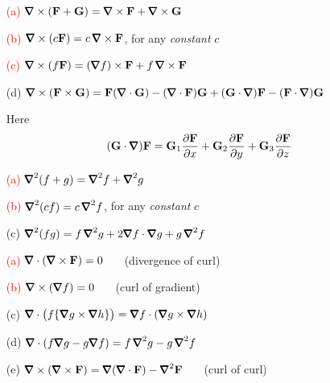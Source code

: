 \begin{theorem}\label{thm:curlIdentities}
\begin{enumerate}
\item[\textcolor{red}{(a)}]
\textcolor{red}{$\vnabla\times(\vF+\vG)=\vnabla\times\vF+\vnabla \times\vG$}
\item[\textcolor{red}{(b)}]
\textcolor{red}{$\vnabla\times(c\vF)=c\,\vnabla\times\vF$}, for any \emph{constant} $c$
\item[\textcolor{red}{(c)}]
\textcolor{red}{$\vnabla\times(f\vF)=(\vnabla f)\times\vF+f\,\vnabla\times\vF$}
\item[(d)]
$\vnabla\times(\vF\times\vG)
=\vF(\vnabla\cdot\vG)-(\vnabla\cdot\vF)\vG
+(\vG\cdot\vnabla)\vF-(\vF\cdot\vnabla)\vG$

Here
\begin{equation*}
(\vG\cdot\vnabla)\vF
=\vG_1\frac{\partial\vF}{\partial x}
 +\vG_2\frac{\partial\vF}{\partial y}
 +\vG_3\frac{\partial\vF}{\partial z}
\end{equation*}

\end{enumerate}
\end{theorem}

\begin{theorem}\label{thm:laplaceIdentities}
\begin{enumerate}
\item[\textcolor{red}{(a)}]
\textcolor{red}{$\vnabla^2(f+g)=\vnabla^2 f+\vnabla^2 g$}
\item[\textcolor{red}{(b)}]
\textcolor{red}{$\vnabla^2(cf)=c\,\vnabla^2 f$}, for any \emph{constant} $c$
\item[(c)]
$\vnabla^2(fg)=f\,\vnabla^2 g+2\vnabla f\cdot\vnabla g+g\,\vnabla^2 f$
\end{enumerate}
\end{theorem}

\begin{theorem}\label{thm:degTwoIdentities}
\begin{enumerate}
\item[\textcolor{red}{(a)}]
\textcolor{red}{$\vnabla\cdot(\vnabla\times\vF)=0$}
\ \ \ (divergence of curl)
\item[\textcolor{red}{(b)}]
\textcolor{red}{$\vnabla\times(\vnabla f)=0$}
\ \ \ (curl of gradient)
\item[(c)]
$\vnabla\cdot\big(f\{\vnabla g\times\vnabla h\}\big)
             =\vnabla f\cdot(\vnabla g\times\vnabla h)$
\item[(d)]
$\vnabla\cdot(f\vnabla g-g\vnabla f)=f\,\vnabla^2g-g\,\vnabla^2f$
\item[(e)]
$\vnabla\times(\vnabla\times\vF)=\vnabla(\vnabla\cdot\vF)-\vnabla^2\vF$
\ \ \ (curl of curl)
\end{enumerate}
\end{theorem}




